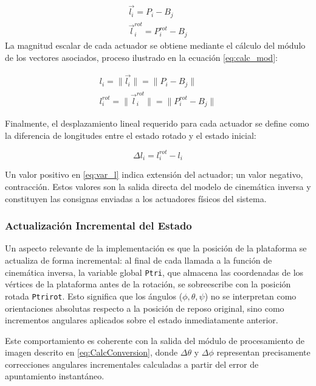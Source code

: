 \begin{enumerate}
\begin{equation}
\begin{aligned}
	\vec{l_i}=P_i-B_j\\
	\vec{l}_i^{rot}=P_i^{rot}-B_j
\end{aligned}
\label{eq:calc_vec}
\end{equation}
La magnitud escalar de cada actuador se obtiene mediante el cálculo del módulo de los vectores asociados, proceso ilustrado en la ecuación \eqref{eq:calc_mod}:

\begin{equation}
\begin{aligned}
	{l_i}=\|{\vec{l_i}}\|=\|P_i-B_j\|\\
	{l}_i^{rot}=\|{\vec{l}_i^{rot}}\|=\|P_i^{rot}-B_j\|
\end{aligned}
\label{eq:calc_mod}
\end{equation}

Finalmente, el desplazamiento lineal requerido para cada actuador se define como la diferencia de longitudes entre el estado rotado y el estado inicial:

\begin{equation}
\Delta l_i=l_i^{rot}-l_i
\label{eq:var_l}
\end{equation}

Un valor positivo en \eqref{eq:var_l} indica extensión del actuador; un valor negativo, contracción. Estos valores son la salida directa del modelo de cinemática inversa y constituyen las consignas enviadas a los actuadores físicos del sistema.

\subsubsection{Actualización Incremental del Estado}\label{sec:Act_Incr}

Un aspecto relevante de la implementación es que la posición de la plataforma se actualiza de forma incremental: al final de cada llamada a la función de cinemática inversa, la variable global \texttt{Ptri}, que almacena las coordenadas de los vértices de la plataforma antes de la rotación, se sobreescribe con la posición rotada \texttt{Ptrirot}. Esto significa que los ángulos ($\phi,\theta,\psi$) no se interpretan como orientaciones absolutas respecto a la posición de reposo original, sino como incrementos angulares aplicados sobre el estado inmediatamente anterior.

Este comportamiento es coherente con la salida del módulo de procesamiento de imagen descrito en \eqref{eq:CalcConversion}, donde $\Delta\theta$ y $\Delta\phi$ representan precisamente correcciones angulares incrementales calculadas a partir del error de apuntamiento instantáneo.


\end{enumerate}
